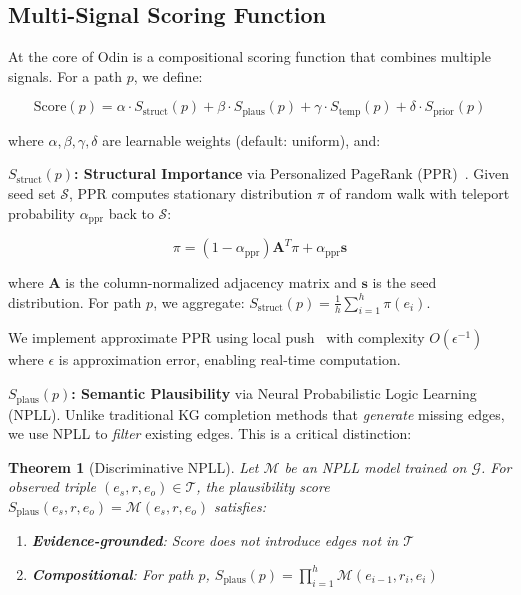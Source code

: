 \documentclass[10pt,twocolumn]{article}
\newtheorem{theorem}{Theorem}
\begin{document}
\subsection{Multi-Signal Scoring Function}

At the core of Odin is a compositional scoring function that combines multiple signals. For a path $p$, we define:

\begin{equation}
\text{Score}(p) = \alpha \cdot S_{\text{struct}}(p) + \beta \cdot S_{\text{plaus}}(p) + \gamma \cdot S_{\text{temp}}(p) + \delta \cdot S_{\text{prior}}(p)
\end{equation}

where $\alpha, \beta, \gamma, \delta$ are learnable weights (default: uniform), and:

\textbf{$S_{\text{struct}}(p)$: Structural Importance} via Personalized PageRank (PPR)~\cite{haveliwala2002topic}. Given seed set $\mathcal{S}$, PPR computes stationary distribution $\pi$ of random walk with teleport probability $\alpha_{\text{ppr}}$ back to $\mathcal{S}$:

\begin{equation}
\pi = (1 - \alpha_{\text{ppr}}) \mathbf{A}^T \pi + \alpha_{\text{ppr}} \mathbf{s}
\end{equation}

where $\mathbf{A}$ is the column-normalized adjacency matrix and $\mathbf{s}$ is the seed distribution. For path $p$, we aggregate: $S_{\text{struct}}(p) = \frac{1}{h} \sum_{i=1}^{h} \pi(e_i)$.

We implement approximate PPR using local push~\cite{andersen2006local} with complexity $O(\epsilon^{-1})$ where $\epsilon$ is approximation error, enabling real-time computation.

\textbf{$S_{\text{plaus}}(p)$: Semantic Plausibility} via Neural Probabilistic Logic Learning (NPLL). Unlike traditional KG completion methods that \textit{generate} missing edges, we use NPLL to \textit{filter} existing edges. This is a critical distinction:

\begin{theorem}[Discriminative NPLL]
Let $\mathcal{M}$ be an NPLL model trained on $\mathcal{G}$. For observed triple $(e_s, r, e_o) \in \mathcal{T}$, the plausibility score $S_{\text{plaus}}(e_s, r, e_o) = \mathcal{M}(e_s, r, e_o)$ satisfies:
\begin{enumerate}
\item \textbf{Evidence-grounded}: Score does not introduce edges not in $\mathcal{T}$
\item \textbf{Compositional}: For path $p$, $S_{\text{plaus}}(p) = \prod_{i=1}^{h} \mathcal{M}(e_{i-1}, r_i, e_i)$
\end{enumerate}
\end{theorem}
\end{document}
